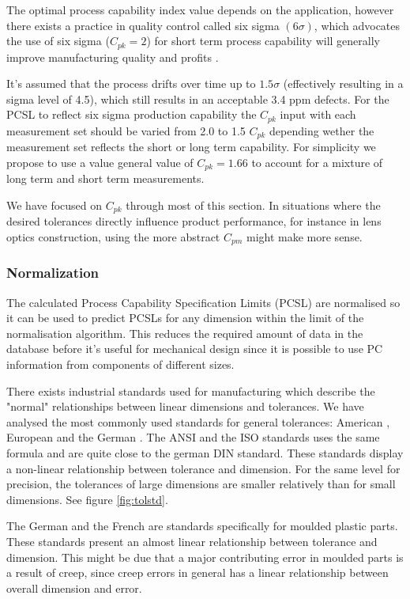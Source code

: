 \documentclass[aip,amsmath, reprint, author-year]{revtex4-1}
\begin{document}
The optimal process capability index value depends on the application, however there exists a practice in quality control called six sigma $(6 \sigma)$, which advocates the use of six sigma ($C_{pk} = 2$) for short term process capability will generally improve manufacturing quality and profits \cite{koch2004design}. 

It's assumed that the process drifts over time up to $1.5 \sigma$  (effectively resulting in a sigma level of 4.5), which still results in an acceptable 3.4 ppm defects.
For the PCSL to reflect six sigma production capability the $C_{pk}$ input with each measurement set should be varied from 2.0 to 1.5 $C_{pk}$ depending wether the measurement set reflects the short or long term capability. 
For simplicity we propose to use a value general value of $C_{pk} = 1.66$ to account for a  mixture of long term and short term measurements. 

We have focused on $C_{pk}$ through most of this section.
In situations where the desired tolerances directly influence product performance, for instance in lens optics construction, using the more abstract $C_{pm}$ might make more sense. 


\subsubsection{Normalization}
The calculated Process Capability Specification Limits (PCSL) are normalised so it can be used to predict PCSLs for any dimension within the limit of the normalisation algorithm. 
This reduces the required amount of data in the database before it's useful for mechanical design since it is possible to use PC information from components of different sizes.

There exists industrial standards used for manufacturing which describe the "normal" relationships between linear dimensions and tolerances. 
We have analysed the most commonly used standards for general tolerances: American \citeauthor{american1978preferred}, European \citeauthor{ISO286} and the German \citeauthor{DIN7168}. 
The ANSI and the ISO standards uses the same formula and are quite close to the german DIN standard. 
These standards display a non-linear relationship between tolerance and dimension. 
For the same level for precision, the tolerances of large dimensions are smaller relatively than for small dimensions. See figure \ref{fig:tolstd}.

The German \citeauthor{DIN16901} and the French \citeauthor{NFT58000} are standards specifically for moulded plastic parts. 
These standards present an almost linear relationship between tolerance and dimension. 
This might be due that a major contributing error in moulded parts is a result of creep, since creep errors in general has a linear relationship between overall dimension and error.
\end{document}
